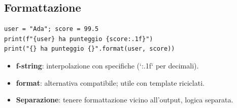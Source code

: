 \subsection{Formattazione}
\begin{lstlisting}
user = "Ada"; score = 99.5
print(f"{user} ha punteggio {score:.1f}")
print("{} ha punteggio {}".format(user, score))
\end{lstlisting}
\begin{tcolorbox}[title=Spiegazione del codice]
\begin{itemize}
  \item \textbf{f-string}: interpolazione con specifiche (`:.1f` per decimali).
  \item \textbf{format}: alternativa compatibile; utile con template riciclati.
  \item \textbf{Separazione}: tenere formattazione vicino all'output, logica separata.
\end{itemize}
\end{tcolorbox}


